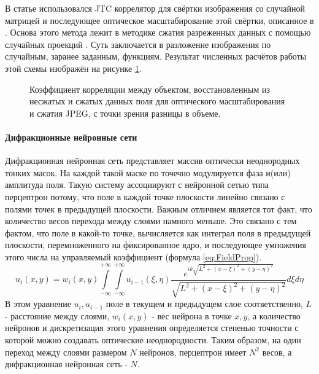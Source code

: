 \FloatBarrier\par
В статье \cite{velez2016optical} использовался JTC коррелятор для свёртки изображения со случайной матрицей и последующее оптическое масштабирование этой свёртки, описанное в \cite{trejos2016optical}. Основа этого метода лежит в методике сжатия разреженных данных с помощью случайных проекций \cite{amador2007random}. Суть заключается в разложение изображения по случайным, заранее заданным, функциям. Результат численных расчётов работы этой схемы изображён на рисунке \ref{ris:RandomProjRes}.
\begin{figure}[h]
	\caption{Коэффициент корреляции между объектом, восстановленным из несжатых и сжатых данных поля для оптического масштабирования и сжатия JPEG, с точки зрения разницы в объеме.}
	\label{ris:RandomProjRes}
\end{figure}





\paragraph{Дифракционные нейронные сети}
Дифракционная нейронная сеть представляет массив оптически неоднородных тонких масок. На каждой такой маске по точечно модулируется фаза и(или) амплитуда поля. Такую систему ассоциируют с нейронной сетью типа перцептрон потому, что поле в каждой точке плоскости линейно связано с полями точек в предыдущей плоскости. Важным отличием является тот факт, что количество весов перехода между слоями намного меньше. Это связано с тем фактом, что поле в какой-то точке, вычисляется как интеграл поля в предыдущей плоскости, перемноженного на фиксированное ядро, и последующее умножения этого числа на управляемый коэффициент (формула \ref{eq:FieldProp}).
\begin{equation}\label{eq:FieldProp}
	u_i(x,y) = w_i(x,y)\int\limits_{-\infty}^{+\infty}\int\limits_{-\infty}^{+\infty}u_{i-1}(\xi,\eta)\frac{e^{ik\sqrt{L^2+(x-\xi)^2+(y-\eta)^2}}}{\sqrt{L^2+(x-\xi)^2+(y-\eta)^2}} d\xi d\eta
\end{equation}
В этом уравнение $u_i,u_{i-1}$ поле в текущем и предыдущем слое соответственно, $L$ - расстояние между слоями, $w_i(x,y)$ - вес нейрона в точке $x,y$, а количество нейронов и дискретизация этого уравнения определяется степенью точности с которой можно создавать оптические неоднородности.
Таким образом, на один переход между слоями размером $N$ нейронов, перцептрон имеет $N^2$ весов, а дифракционная нейронная сеть - $N$.

